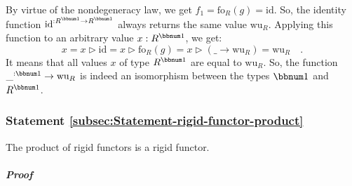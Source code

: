 By virtue of the nondegeneracy law, we get $f_{1}=\text{fo}_{R}(g)=\text{id}$.
So, the identity function $\text{id}^{:R^{\bbnum 1}\rightarrow R^{\bbnum 1}}$
always returns the same value $\text{wu}_{R}$. Applying this function
to an arbitrary value $x:R^{\bbnum 1}$, we get:
\[
x=x\triangleright\text{id}=x\triangleright\text{fo}_{R}(g)=x\triangleright(\_\rightarrow\text{wu}_{R})=\text{wu}_{R}\quad.
\]
It means that all values $x$ of type $R^{\bbnum 1}$ are equal to
$\text{wu}_{R}$. So, the function $\_^{:\bbnum 1}\rightarrow\text{wu}_{R}$
is indeed an isomorphism between the types $\bbnum 1$ and $R^{\bbnum 1}$.

\subsubsection{Statement \label{subsec:Statement-rigid-functor-product}\ref{subsec:Statement-rigid-functor-product}}

The product of rigid functors is a rigid functor.

\subparagraph{Proof}


